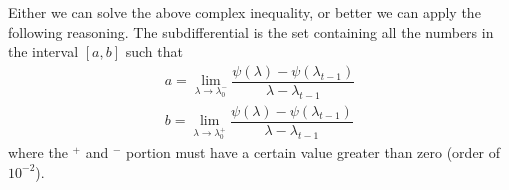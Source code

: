 \documentclass[notitlepage]{article}
\begin{document}
Either we can solve the above complex inequality, or better we can apply the following reasoning. The subdifferential is the set containing all the numbers in the 
interval $\left[a,b\right]$ such that
\begin{align*}
  a = \lim_{\lambda \rightarrow \lambda_0^-} \dfrac{\psi(\lambda) - \psi(\lambda_{t-1})}{\lambda - \lambda_{t-1}} \\
  b = \lim_{\lambda \rightarrow \lambda_0^+} \dfrac{\psi(\lambda) - \psi(\lambda_{t-1})}{\lambda - \lambda_{t-1}}
\end{align*}
where the $^+$ and $^-$ portion must have a certain value greater than zero (order of $10^{-2}$).
\end{document}
